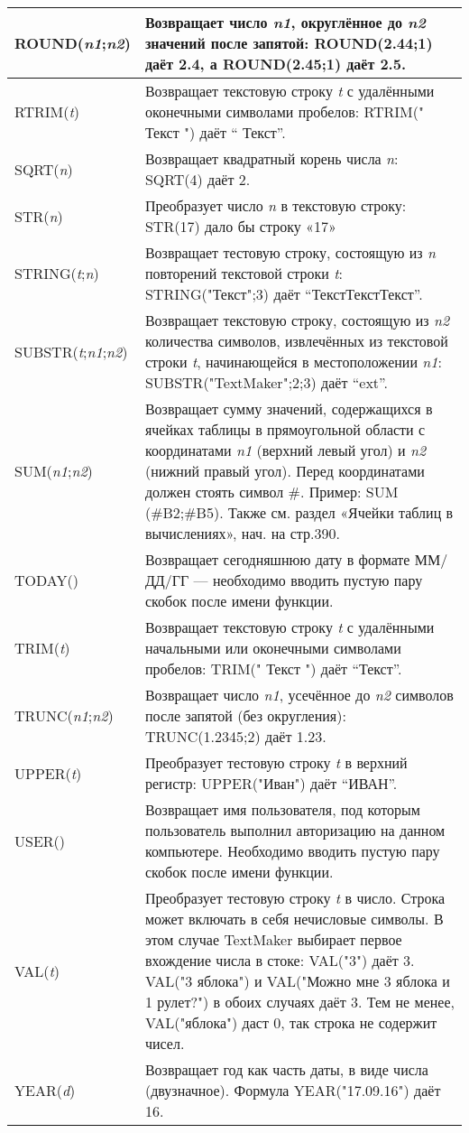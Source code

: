 ﻿\documentclass[a4paper,10pt]{article}
\begin{document}
\begin{center}
\begin{longtable}{  m{3cm} | m{13cm}  }
\hline
ROUND(\textit{n1};\textit{n2}) & Возвращает число \textit{n1}, округлённое до \textit{n2} значений после запятой: ROUND(2.44;1) даёт 2.4, а ROUND(2.45;1) даёт 2.5.\\
\hline
RTRIM(\textit{t}) & Возвращает текстовую строку \textit{t} с удалёнными оконечными символами пробелов: RTRIM(" Текст ") даёт “ Текст”.\\
\hline
SQRT(\textit{n}) & Возвращает квадратный корень числа \textit{n}: SQRT(4) даёт 2.\\
\hline
STR(\textit{n}) & Преобразует число \textit{n} в текстовую строку: STR(17) дало бы строку «17»\\
\hline
STRING(\textit{t};\textit{n}) & Возвращает тестовую строку, состоящую из \textit{n} повторений текстовой строки \textit{t}: STRING("Текст";3) даёт “ТекстТекстТекст”.\\
\hline
SUBSTR(\textit{t};\textit{n1};\textit{n2}) & Возвращает текстовую строку, состоящую из \textit{n2} количества символов, извлечённых из текстовой строки \textit{t}, начинающейся в местоположении \textit{n1}: SUBSTR("TextMaker";2;3) даёт “ext”.\\
\hline
SUM(\textit{n1};\textit{n2}) & Возвращает сумму значений, содержащихся в ячейках таблицы в прямоугольной области с координатами \textit{n1} (верхний левый угол) и \textit{n2} (нижний правый угол). Перед координатами должен стоять символ \#. Пример: SUM (\#B2;\#B5). Также см. раздел «Ячейки таблиц в вычислениях», нач. на стр.390.\\
\hline
TODAY() & Возвращает сегодняшнюю дату в формате ММ/ДД/ГГ — необходимо вводить пустую пару скобок после имени функции.\\
\hline
TRIM(\textit{t}) & Возвращает текстовую строку \textit{t} с удалёнными начальными или оконечными символами пробелов: TRIM(" Текст ") даёт “Текст”.\\
\hline
TRUNC(\textit{n1};\textit{n2}) & Возвращает число \textit{n1}, усечённое до \textit{n2} символов после запятой (без округления): TRUNC(1.2345;2) даёт 1.23.\\
\hline
UPPER(\textit{t}) & Преобразует тестовую строку \textit{t} в верхний регистр: UPPER("Иван") даёт “ИВАН”.\\
\hline
USER() & Возвращает имя пользователя, под которым пользователь выполнил авторизацию на данном компьютере. Необходимо вводить пустую пару скобок после имени функции.\\
\hline
VAL(\textit{t}) & Преобразует тестовую строку \textit{t} в число. Строка может включать в себя нечисловые символы. В этом случае TextMaker выбирает первое вхождение числа в стоке: VAL("3") даёт 3. VAL("3 яблока") и  VAL("Можно мне 3 яблока и 1 рулет?") в обоих случаях даёт 3. Тем не менее, VAL("яблока") даст 0, так строка не содержит чисел.\\
\hline
YEAR(\textit{d}) & Возвращает год как часть даты, в виде числа (двузначное). Формула YEAR("17.09.16") даёт 16.\\
\hline
\end{longtable}
\end{center}
\end{document}
